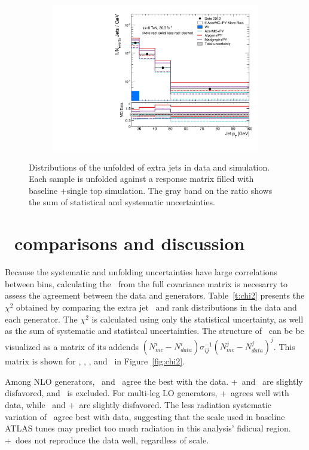 \begin{figure}
\begin{subfigure}[]{0.45\textwidth}
\end{subfigure}
\begin{subfigure}[]{0.45\textwidth}
\includegraphics[width=\textwidth]{fig/DataUnfold/LOSys/PtJet3.pdf}
\end{subfigure}
\caption{Distributions of the unfolded \pt of extra jets in data and simulation. Each sample is unfolded against a response matrix filled with baseline \ttbar+single top simulation. The gray band on the ratio shows the sum of statistical and systematic uncertainties.}
 \label{fig:unfptlosys}
 \end{figure}
 \section{\chisq\ comparisons and discussion}

Because the systematic and unfolding uncertainties have large correlations between bins,  
calculating the \chisq\ from the full covariance matrix is necesarry to assess the  agreement between the data and generators. Table~\ref{t:chi2} presents the $\chi^2$ obtained by comparing the  extra jet \pt\ and rank distributions in the data and each generator. The $\chi^2$ is calculated using only the statistical uncertainty, as well as the sum of systematic and statistcal uncertainties. The structure of \chisq\ can be be visualized as a matrix of its addends $(N^{i}_{mc}-N^{i}_{data})\sigma^{-1}_{ij}(N^{j}_{mc}-N^{j}_{data})^{j}$. This matrix is shown for \powpy, \hdamp, \madpy, and \peight\ in Figure~\ref{fig:chi2}.

Among NLO generators, \hdamp\ and \powpy\ agree the best with the data. \pow+\hw\ and \peight\ are slightly disfavored, and \mcnlohw\ is excluded. For multi-leg LO generators, \alpg+\py\ agrees well with data, while \madpy\ and \alpg+\hw\ are slightly disfavored. The less radiation systematic variation of \madpy\  agree best with data, suggesting that the scale used in baseline ATLAS tunes may predict too much radiation in this analysis' fidicual region. \acermc+\py\ does not reproduce the data well, regardless of scale.





